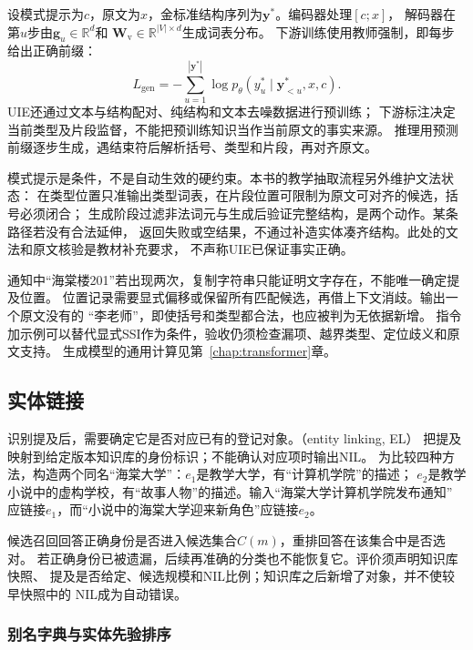 设模式提示为$c$，原文为$x$，金标准结构序列为$\bm{y}^{*}$。编码器处理$[c;x]$，
解码器在第$u$步由$\bm{g}_u\in\mathbb{R}^{d}$和
$\bm{W}_{\mathrm{v}}\in\mathbb{R}^{|V|\times d}$生成词表分布。
下游训练使用教师强制，即每步给出正确前缀：
\begin{equation}
  L_{\mathrm{gen}}=
  -\sum_{u=1}^{|\bm{y}^{*}|}
  \log p_\theta(y_u^{*}\mid \bm{y}_{<u}^{*},x,c).
  \label{eq:nlp-extraction-generation}
\end{equation}
UIE还通过文本与结构配对、纯结构和文本去噪数据进行预训练；
下游标注决定当前类型及片段监督，不能把预训练知识当作当前原文的事实来源。
推理用预测前缀逐步生成，遇结束符后解析括号、类型和片段，再对齐原文。

模式提示是条件，不是自动生效的硬约束。本书的教学抽取流程另外维护文法状态：
在类型位置只准输出类型词表，在片段位置可限制为原文可对齐的候选，括号必须闭合；
生成阶段过滤非法词元与生成后验证完整结构，是两个动作。某条路径若没有合法延伸，
返回失败或空结果，不通过补造实体凑齐结构。此处的文法和原文核验是教材补充要求，
不声称UIE已保证事实正确。

通知中“海棠楼201”若出现两次，复制字符串只能证明文字存在，不能唯一确定提及位置。
位置记录需要显式偏移或保留所有匹配候选，再借上下文消歧。输出一个原文没有的
“李老师”，即使括号和类型都合法，也应被判为无依据新增。
指令加示例可以替代显式SSI作为条件，验收仍须检查漏项、越界类型、定位歧义和原文支持。
生成模型的通用计算见第~\ref{chap:transformer}章。

\subsection{实体链接}
\label{sec:nlp-extraction-linking}

识别提及后，需要确定它是否对应已有的登记对象。（entity linking, EL）
把提及映射到给定版本知识库的身份标识；不能确认对应项时输出NIL。
为比较四种方法，构造两个同名“海棠大学”：$e_1$是教学大学，有“计算机学院”的描述；
$e_2$是教学小说中的虚构学校，有“故事人物”的描述。输入“海棠大学计算机学院发布通知”
应链接$e_1$，而“小说中的海棠大学迎来新角色”应链接$e_2$。

候选召回回答正确身份是否进入候选集合$C(m)$，重排回答在该集合中是否选对。
若正确身份已被遗漏，后续再准确的分类也不能恢复它。评价须声明知识库快照、
提及是否给定、候选规模和NIL比例；知识库之后新增了对象，并不使较早快照中的
NIL成为自动错误。

\subsubsection{别名字典与实体先验排序}
\label{sec:nlp-extraction-alias}

